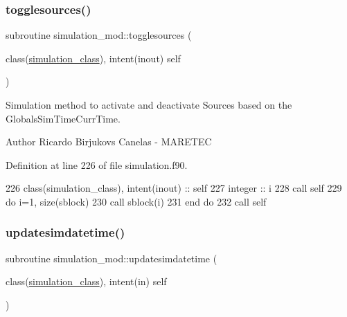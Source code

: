 \subsubsection{\texorpdfstring{togglesources()}{togglesources()}}
{\footnotesize\ttfamily subroutine simulation\+\_\+mod\+::togglesources (\begin{DoxyParamCaption}\item[{class(\mbox{\hyperlink{structsimulation__mod_1_1simulation__class}{simulation\+\_\+class}}), intent(inout)}]{self }\end{DoxyParamCaption})\hspace{0.3cm}{\ttfamily [private]}}



Simulation method to activate and deactivate Sources based on the GlobalsSim\+TimeCurr\+Time. 

\begin{DoxyAuthor}{Author}
Ricardo Birjukovs Canelas -\/ M\+A\+R\+E\+T\+EC 
\end{DoxyAuthor}


Definition at line 226 of file simulation.\+f90.


\begin{DoxyCode}
226     \textcolor{keywordtype}{class}(simulation\_class), \textcolor{keywordtype}{intent(inout)} :: self
227     \textcolor{keywordtype}{integer} :: i
228     \textcolor{keyword}{call }self%
229     \textcolor{keywordflow}{do} i=1, \textcolor{keyword}{size}(sblock)
230         \textcolor{keyword}{call }sblock(i)%
231 \textcolor{keywordflow}{    end do}
232     \textcolor{keyword}{call }self%
\end{DoxyCode}
\mbox{\label{namespacesimulation__mod_a844f0fae91502f3fc79cc1223f55a86c}} 
\subsubsection{\texorpdfstring{updatesimdatetime()}{updatesimdatetime()}}
{\footnotesize\ttfamily subroutine simulation\+\_\+mod\+::updatesimdatetime (\begin{DoxyParamCaption}\item[{class(\mbox{\hyperlink{structsimulation__mod_1_1simulation__class}{simulation\+\_\+class}}), intent(in)}]{self }\end{DoxyParamCaption})\hspace{0.3cm}{\ttfamily [private]}}




